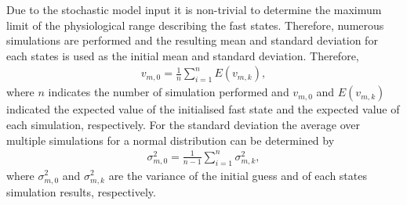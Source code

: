 Due to the stochastic model input it is non-trivial to determine the maximum limit of the physiological range describing the fast states. Therefore, numerous simulations are performed and the resulting mean and standard deviation for each states is used as the initial mean and standard deviation. Therefore, \begin{align}
v_{m,0} = \frac{1}{n}\sum\limits_{i=1}^n E(v_{m,k}), \end{align} where $n$ indicates the number of simulation performed and $v_{m,0}$ and $E(v_{m,k})$ indicated the expected value of the initialised fast state and the expected value of each simulation, respectively. For the standard deviation the average over multiple simulations for a normal distribution can be determined by \begin{align}
\sigma^2_{m,0} = \frac{1}{n-1}\sum\limits_{i=1}^n \sigma^2_{m,k},\end{align} where $\sigma^2_{m,0}$ and $\sigma^2_{m,k}$ are the variance of the initial guess and of each states simulation results, respectively.

